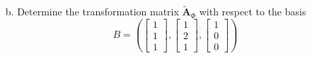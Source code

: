 \documentclass[11pt]{article}
\newcommand{\mat}[1]{\mathbf{#1}}   %
\newcommand{\args}[1]{\!\left(#1\right)}                 %
\theoremstyle{definition}
\theoremstyle{plain}
\theoremstyle{remark}
\begin{document}
\begin{enumerate}
\begin{enumerate}
              \item[b.] Determine the transformation matrix $\tilde{\mat{A}}_\Phi$ with respect to the basis
                    \[
                        B = \args{
                            \begin{bmatrix} 1 \\ 1 \\ 1 \end{bmatrix}\!,\!
                            \begin{bmatrix} 1 \\ 2 \\ 1 \end{bmatrix}\!,\!
                            \begin{bmatrix} 1 \\ 0 \\ 0 \end{bmatrix}
                        }
                    \]


\end{enumerate}
\end{enumerate}
\end{document}
